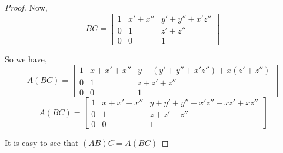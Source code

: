 \documentclass[a4paper]{report}
\begin{document}
\begin{proof}
Now, 
$$BC = \begin{bmatrix} 1 &  x' + x'' & y' + y'' + x'z'' \\ 0 & 1 &  z' + z''\\ 0 & 0 & 1\end{bmatrix} $$


So we have, 
$$ A (BC) =  \begin{bmatrix} 1 & x + x' + x'' & y + (y' + y'' + x'z'') + x(z' + z'')  \\ 0 & 1 & z + z' + z'' \\ 0 & 0 & 1\end{bmatrix}  $$ 
$$ A (BC) =  \begin{bmatrix} 1 & x + x' + x'' & y + y' + y'' + x'z'' + xz' + xz''  \\ 0 & 1 & z + z' + z'' \\ 0 & 0 & 1\end{bmatrix}  $$ 


It is easy to see that $(AB)C = A(BC)$
\end{proof}
\end{document}
